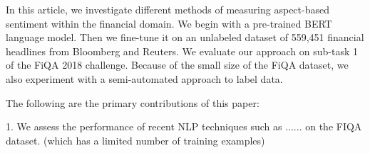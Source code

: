

In this article, we investigate different methods of measuring aspect-based sentiment within the financial domain.
We begin with a pre-trained BERT language model.
Then we fine-tune it on an unlabeled dataset of 559,451 financial headlines from Bloomberg and Reuters.
We evaluate our approach on sub-task 1 of the FiQA 2018 challenge.
Because of the small size of the FiQA dataset, we also experiment with a semi-automated approach to label data.



The following are the primary contributions of this paper:

1. We assess the performance of recent NLP techniques such as ...... on the FIQA dataset. (which has a limited number of training examples)

